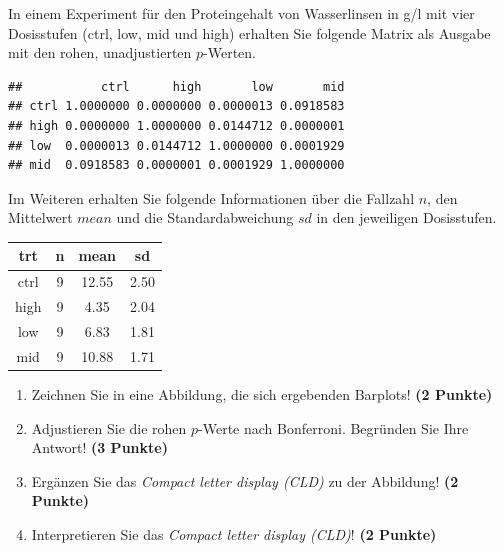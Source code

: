 \documentclass[a4paper, 10pt]{scrartcl}\usepackage[]{graphicx}\usepackage[]{xcolor}
\makeatletter
\newenvironment{kframe}{%
 \def\at@end@of@kframe{}%
 \ifinner\ifhmode%
  \def\at@end@of@kframe{\end{minipage}}%
  \begin{minipage}{\columnwidth}%
 \fi\fi%
 \def\FrameCommand##1{\hskip\@totalleftmargin \hskip-\fboxsep
 \colorbox{shadecolor}{##1}\hskip-\fboxsep
     \hskip-\linewidth \hskip-\@totalleftmargin \hskip\columnwidth}%
 \MakeFramed {\advance\hsize-\width
   \@totalleftmargin\z@ \linewidth\hsize
   \@setminipage}}%
 {\par\unskip\endMakeFramed%
 \at@end@of@kframe}
\newenvironment{knitrout}{}{} %
\makeatother
\begin{document}
 
 In einem Experiment f{\"u}r den Proteingehalt von Wasserlinsen in g/l mit vier
 Dosisstufen (ctrl, low, mid und high) erhalten Sie folgende Matrix als
 \Rlogo Ausgabe mit den rohen, unadjustierten $p$-Werten.



\begin{knitrout}
\color{fgcolor}\begin{kframe}
\begin{verbatim}
##           ctrl      high       low       mid
## ctrl 1.0000000 0.0000000 0.0000013 0.0918583
## high 0.0000000 1.0000000 0.0144712 0.0000001
## low  0.0000013 0.0144712 1.0000000 0.0001929
## mid  0.0918583 0.0000001 0.0001929 1.0000000
\end{verbatim}
\end{kframe}
\end{knitrout}

Im Weiteren erhalten Sie folgende Informationen {\"u}ber die Fallzahl $n$, den
Mittelwert $mean$ und die Standardabweichung $sd$ in den jeweiligen Dosisstufen.

\begin{knitrout}
\color{fgcolor}\begin{table}[!h]
\centering
\begin{tabular}{cccc}
\toprule
trt & n & mean & sd\\
\midrule
ctrl & 9 & 12.55 & 2.50\\
high & 9 & 4.35 & 2.04\\
low & 9 & 6.83 & 1.81\\
mid & 9 & 10.88 & 1.71\\
\bottomrule
\end{tabular}
\end{table}

\end{knitrout}


\begin{enumerate}
\item Zeichnen Sie in eine Abbildung, die sich ergebenden Barplots! \textbf{(2 Punkte)}
\item Adjustieren Sie die rohen $p$-Werte nach Bonferroni. Begr{\"u}nden Sie Ihre Antwort! \textbf{(3 Punkte)}
\item Erg{\"a}nzen Sie das \textit{Compact letter display (CLD)} zu der
  Abbildung! \textbf{(2 Punkte)}
\item Interpretieren Sie das \textit{Compact letter display (CLD)}! \textbf{(2 Punkte)} 
\end{enumerate}
\end{document}
